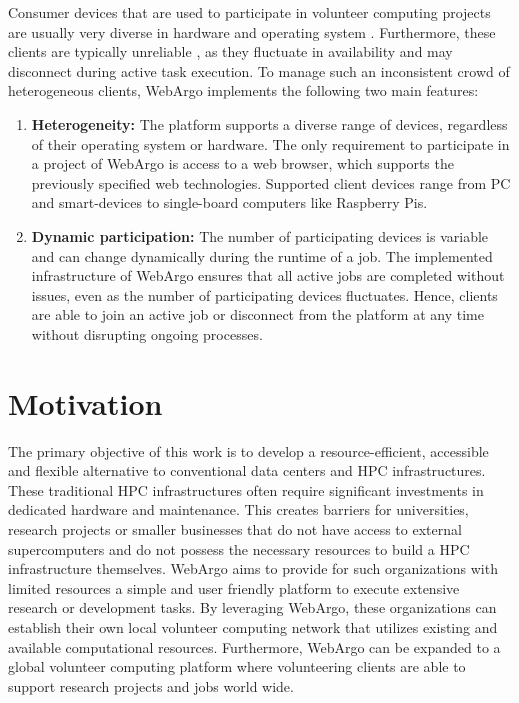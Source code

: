 Consumer devices that are used to participate in volunteer computing projects are usually very diverse in hardware and operating system \cite{intro:diverseDevices}. Furthermore, these clients are typically unreliable \cite{relatedwork:boinc1}, as they fluctuate in availability and may disconnect during active task execution. To manage such an inconsistent crowd of heterogeneous clients, WebArgo implements the following two main features:
\begin{enumerate}
    \item \textbf{Heterogeneity:} The platform supports a diverse range of devices, regardless of their operating system or hardware. The only requirement to participate in a project of WebArgo is access to a web browser, which supports the previously specified web technologies. Supported client devices range from \ac{PC} and smart-devices to single-board computers like Raspberry Pis.
    \item \textbf{Dynamic participation:} The number of participating devices is variable and can change dynamically during the runtime of a job. The implemented infrastructure of WebArgo ensures that all active jobs are completed without issues, even as the number of participating devices fluctuates. Hence, clients are able to join an active job or disconnect from the platform at any time without disrupting ongoing processes.
\end{enumerate}

\section{Motivation}
\label{sec:intro:motivation}
The primary objective of this work is to develop a resource-efficient, accessible and flexible alternative to conventional data centers and \ac{HPC} infrastructures. These traditional \ac{HPC} infrastructures often require significant investments in dedicated hardware and maintenance. This creates barriers for universities, research projects or smaller businesses that do not have access to external supercomputers and do not possess the necessary resources to build a \ac{HPC} infrastructure themselves. WebArgo aims to provide for such organizations with limited resources a simple and user friendly platform to execute extensive research or development tasks. By leveraging WebArgo, these organizations can establish their own local volunteer computing network that utilizes existing and available computational resources. Furthermore, WebArgo can be expanded to a global volunteer computing platform where volunteering clients are able to support research projects and jobs world wide.

